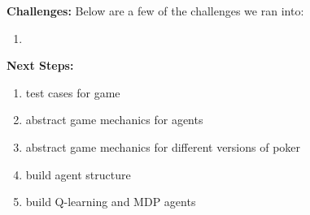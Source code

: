 \documentclass[]{article}
\begin{document}
\textbf{Challenges:} Below are a few of the challenges we ran into:
\begin{enumerate}
    \item
\end{enumerate}
\textbf{Next Steps:}
\begin{enumerate}
    \item test cases for game
    \item abstract game mechanics for agents
    \item abstract game mechanics for different versions of poker
    \item build agent structure
    \item build Q-learning and MDP agents
\end{enumerate}
\end{document}
